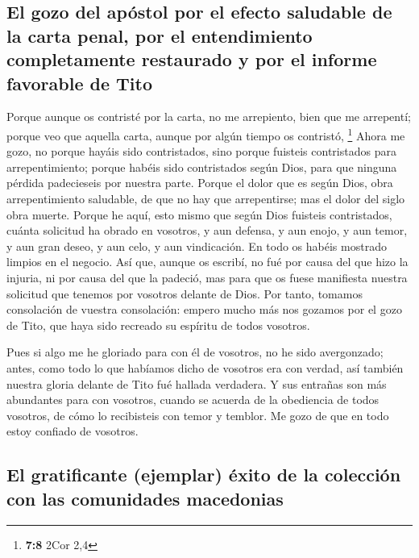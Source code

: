 \hypertarget{el-gozo-del-apuxf3stol-por-el-efecto-saludable-de-la-carta-penal-por-el-entendimiento-completamente-restaurado-y-por-el-informe-favorable-de-tito}{%
\subsection{El gozo del apóstol por el efecto saludable de la carta
penal, por el entendimiento completamente restaurado y por el informe
favorable de
Tito}\label{el-gozo-del-apuxf3stol-por-el-efecto-saludable-de-la-carta-penal-por-el-entendimiento-completamente-restaurado-y-por-el-informe-favorable-de-tito}}

 Porque aunque os contristé por la carta, no me arrepiento,
bien que me arrepentí; porque veo que aquella carta, aunque por algún
tiempo os contristó, \footnote{\textbf{7:8} 2Cor 2,4}  Ahora
me gozo, no porque hayáis sido contristados, sino porque fuisteis
contristados para arrepentimiento; porque habéis sido contristados según
Dios, para que ninguna pérdida padecieseis por nuestra parte.
 Porque el dolor que es según Dios, obra arrepentimiento
saludable, de que no hay que arrepentirse; mas el dolor del siglo obra
muerte.  Porque he aquí, esto mismo que según Dios fuisteis
contristados, cuánta solicitud ha obrado en vosotros, y aun defensa, y
aun enojo, y aun temor, y aun gran deseo, y aun celo, y aun vindicación.
En todo os habéis mostrado limpios en el negocio.  Así que,
aunque os escribí, no fué por causa del que hizo la injuria, ni por
causa del que la padeció, mas para que os fuese manifiesta nuestra
solicitud que tenemos por vosotros delante de Dios.  Por
tanto, tomamos consolación de vuestra consolación: empero mucho más nos
gozamos por el gozo de Tito, que haya sido recreado su espíritu de todos
vosotros.

 Pues si algo me he gloriado para con él de vosotros, no he
sido avergonzado; antes, como todo lo que habíamos dicho de vosotros era
con verdad, así también nuestra gloria delante de Tito fué hallada
verdadera.  Y sus entrañas son más abundantes para con
vosotros, cuando se acuerda de la obediencia de todos vosotros, de cómo
lo recibisteis con temor y temblor.  Me gozo de que en todo
estoy confiado de vosotros.

\hypertarget{el-gratificante-ejemplar-uxe9xito-de-la-colecciuxf3n-con-las-comunidades-macedonias}{%
\subsection{El gratificante (ejemplar) éxito de la colección con las
comunidades
macedonias}\label{el-gratificante-ejemplar-uxe9xito-de-la-colecciuxf3n-con-las-comunidades-macedonias}}

